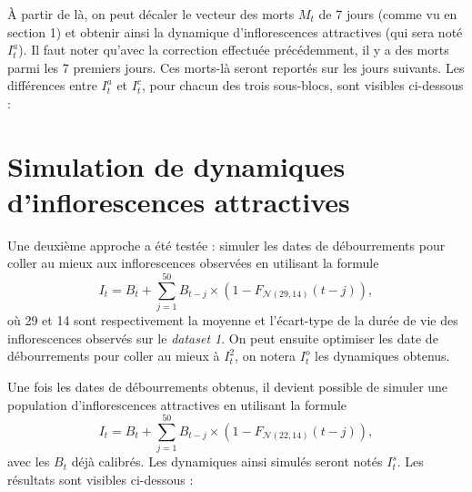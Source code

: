 \documentclass[a4paper, 11pt]{article}
\begin{document}
À partir de là, on peut décaler le vecteur des morts $M_t$ de 7 jours (comme vu en section 1) et obtenir ainsi la dynamique d'inflorescences attractives (qui sera noté $I_t^a$). Il faut noter qu'avec la correction effectuée précédemment, il y a des morts parmi les 7 premiers jours. Ces morts-là seront reportés sur les jours suivants.
Les différences entre $I_t^a$ et $I_t^c$, pour chacun des trois sous-blocs, sont visibles ci-dessous :

\begin{figure}[h]
 \centering
\end{figure}
 
\begin{figure}[h]
 \centering
\end{figure}

\begin{figure}[h]
 \centering
\end{figure}


\section{Simulation de dynamiques d'inflorescences attractives}

Une deuxième approche a été testée : simuler les dates de débourrements pour coller au mieux aux inflorescences observées en utilisant la formule
$$I_t = B_t + \sum_{j = 1}^{50} B_{t-j}\times \left( 1 - F_{\mathcal{N}\left( 29, 14 \right)}(t-j) \right),$$
où 29 et 14 sont respectivement la moyenne et l’écart-type de la durée de vie des inflorescences observés sur le \textit{dataset 1}. On peut ensuite optimiser les date de débourrements pour coller au mieux à $I_t^2$, on notera $I_t^o$ les dynamiques obtenus.

Une fois les dates de débourrements obtenus, il devient possible de simuler une population d’inflorescences
attractives en utilisant la formule
$$I_t = B_t + \sum_{j = 1}^{50} B_{t-j}\times \left( 1 - F_{\mathcal{N}\left( 22, 14 \right)}(t-j) \right),$$
avec les $B_t$ déjà calibrés. Les dynamiques ainsi simulés seront notés $I_t^s$. Les résultats sont visibles ci-dessous :

\begin{figure}[!h]
 \centering
\end{figure}
 
\begin{figure}[!h]
 \centering
\end{figure}
\end{document}

